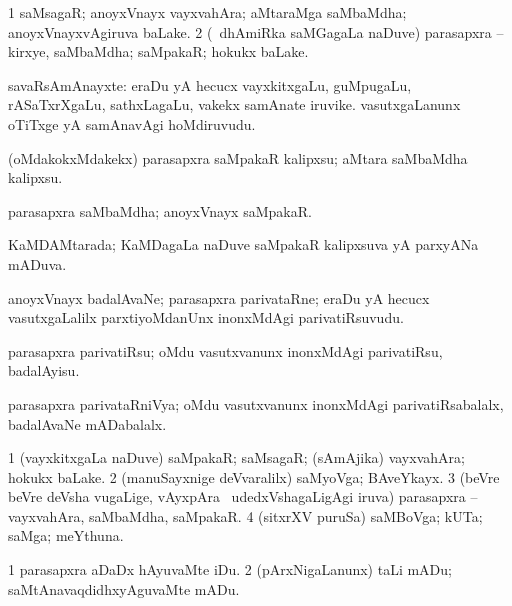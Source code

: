 \bentry
{}
\gl{\nA}
\bmng
\bnum
\num{1} saMsagaR; anoyxVnayx vayxvahAra; aMtaraMga saMbaMdha; anoyxVnayxvAgiruva baLake. 
\num{2} (\kanmu\ dhAmiRka saMGagaLa naDuve) parasapxra -- kirxye, saMbaMdha; saMpakaR; hokukx baLake. 
\enum
\emng
\eentry

\bentry
{}
\gl{\nA}
\bmng
savaRsAmAnayxte: 
\banum
{} eraDu yA hecucx vayxkitxgaLu, guMpugaLu, rASaTxrXgaLu, sathxLagaLu, \mo vakekx samAnate iruvike. 
 vasutxgaLanunx oTiTxge yA samAnavAgi hoMdiruvudu. 
\eanum
\emng
\eentry

\bentry
{}
\gl{\sakirx}
\bmng
(oMdakokxMdakekx) parasapxra saMpakaR kalipxsu; aMtara saMbaMdha kalipxsu. 
\emng
\eentry

\bentry
{}
\gl{\nA}
\bmng
parasapxra saMbaMdha; anoyxVnayx saMpakaR. 
\emng
\eentry

\bentry
{}
\gl{\gu}
\bmng
KaMDAMtarada; KaMDagaLa naDuve saMpakaR kalipxsuva yA parxyANa mADuva. 
\emng
\eentry

\bentry
{}
\gl{\nA}
\bmng
anoyxVnayx badalAvaNe; parasapxra parivataRne; eraDu yA hecucx vasutxgaLalilx parxtiyoMdanUnx inonxMdAgi parivatiRsuvudu. 
\emng
\eentry

\bentry
{}
\gl{\sakirx}
\bmng
parasapxra parivatiRsu; oMdu vasutxvanunx inonxMdAgi parivatiRsu, badalAyisu. 
\emng
\eentry

\bentry
{}
\gl{\gu}
\bmng
parasapxra parivataRniVya; oMdu vasutxvanunx inonxMdAgi parivatiRsabalalx, badalAvaNe mADabalalx. 
\emng
\eentry

\bentry
{}
\gl{\nA}
\bmng
\bnum
\num{1} (vayxkitxgaLa naDuve) saMpakaR; saMsagaR; (sAmAjika) vayxvahAra; hokukx baLake. 
\num{2} (manuSayxnige deVvaralilx) saMyoVga; BAveYkayx. 
\num{3} (beVre beVre deVsha \mo vugaLige, vAyxpAra \mo\ udedxVshagaLigAgi iruva) parasapxra -- vayxvahAra, saMbaMdha, saMpakaR. 
\num{4} (sitxrXV puruSa) saMBoVga; kUTa; saMga; meYthuna. 
\enum
\emng
\eentry

\bentry
{}
\gl{\sakirx}
\bmng
\bnum
\num{1} parasapxra aDaDx hAyuvaMte iDu. 
\num{2} (pArxNigaLanunx) taLi mADu; saMtAnavaqdidhxyAguvaMte mADu. 
\enum
\emng

